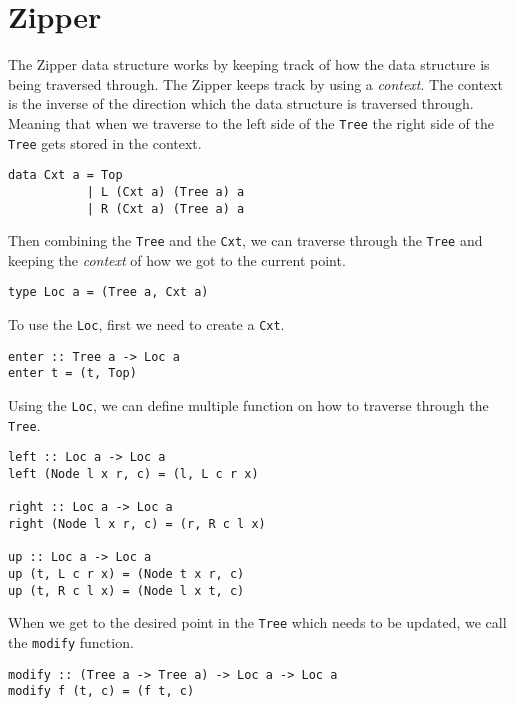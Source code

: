 \section{Zipper}


The Zipper data structure works by keeping track of how the data structure is being traversed through. The Zipper keeps track by using a \textit{context}. The context is the inverse of the direction which the data structure is traversed through. Meaning that when we traverse to the left side of the \texttt{Tree} the right side of the \texttt{Tree} gets stored in the context. 

\begin{verbatim}
data Cxt a = Top
           | L (Cxt a) (Tree a) a
           | R (Cxt a) (Tree a) a
\end{verbatim}

Then combining the \texttt{Tree} and the \texttt{Cxt}, we can traverse through the \texttt{Tree} and keeping the \textit{context} of how we got to the current point.

\begin{verbatim}
type Loc a = (Tree a, Cxt a)
\end{verbatim}

To use the \texttt{Loc}, first we need to create a \texttt{Cxt}.

\begin{verbatim}
enter :: Tree a -> Loc a
enter t = (t, Top)
\end{verbatim}

Using the \texttt{Loc}, we can define multiple function on how to traverse through the \texttt{Tree}.

\begin{verbatim}
left :: Loc a -> Loc a
left (Node l x r, c) = (l, L c r x)

right :: Loc a -> Loc a
right (Node l x r, c) = (r, R c l x)

up :: Loc a -> Loc a
up (t, L c r x) = (Node t x r, c)
up (t, R c l x) = (Node l x t, c)
\end{verbatim}

When we get to the desired point in the \texttt{Tree} which needs to be updated, we call the \texttt{modify} function.

\begin{verbatim}
modify :: (Tree a -> Tree a) -> Loc a -> Loc a
modify f (t, c) = (f t, c)
\end{verbatim}

